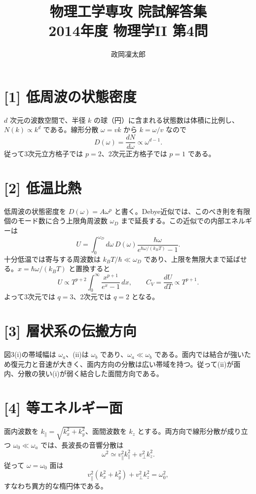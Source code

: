 \documentclass[11pt,a4paper]{article}
\title{物理工学専攻 院試解答集\\2014年度 物理学II 第4問}
\author{政岡凜太郎}
\date{}
\begin{document}
\maketitle

\section*{[1] 低周波の状態密度}
$d$ 次元の波数空間で、半径 $k$ の球（円）に含まれる状態数は体積に比例し、$N(k)\propto k^d$ である。線形分散 $\omega=vk$ から $k=\omega/v$ なので
\begin{equation}
 D(\omega)=\frac{dN}{d\omega}\propto\omega^{d-1}.
\end{equation}
従って3次元立方格子では $p=2$、2次元正方格子では $p=1$ である。

\section*{[2] 低温比熱}
低周波の状態密度を $D(\omega)=A\omega^p$ と書く。Debye近似では、このべき則を有限個のモード数に合う上限角周波数 $\omega_D$ まで延長する。この近似での内部エネルギーは
\begin{equation}
 U=\int_0^{\omega_D}d\omega\,D(\omega)
 \frac{\hbar\omega}{e^{\hbar\omega/(k_BT)}-1}.
\end{equation}
十分低温では寄与する周波数は $k_BT/\hbar\ll\omega_D$ であり、上限を無限大まで延ばせる。$x=\hbar\omega/(k_BT)$ と置換すると
\begin{equation}
 U\propto T^{p+2}\int_0^\infty\frac{x^{p+1}}{e^x-1}\,dx,
 \qquad C_V=\frac{dU}{dT}\propto T^{p+1}.
\end{equation}
よって3次元では $q=3$、2次元では $q=2$ となる。

\section*{[3] 層状系の伝搬方向}
図3(i)の帯域幅は $\omega_a$、(ii)は $\omega_b$ であり、$\omega_a\ll\omega_b$ である。面内では結合が強いため復元力と音速が大きく、面内方向の分散は広い帯域を持つ。従って(ii)が面内、分散の狭い(i)が弱く結合した面間方向である。

\section*{[4] 等エネルギー面}
面内波数を $k_\parallel=\sqrt{k_x^2+k_y^2}$、面間波数を $k_z$ とする。両方向で線形分散が成り立つ $\omega_0\ll\omega_a$ では、長波長の音響分散は
\begin{equation}
 \omega^2\simeq v_\parallel^2k_\parallel^2+v_\perp^2k_z^2.
\end{equation}
従って $\omega=\omega_0$ 面は
\begin{equation}
 v_\parallel^2(k_x^2+k_y^2)+v_\perp^2k_z^2=\omega_0^2,
\end{equation}
すなわち異方的な楕円体である。
\end{document}
